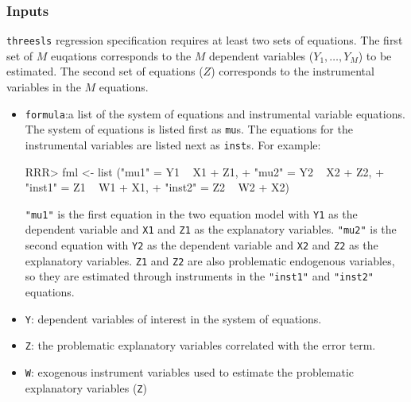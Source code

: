 \subsubsection{Inputs}
\texttt{threesls} regression specification requires at least two sets of equations. The first set of $M$ euqations
corresponds to the $M$ dependent variables ($Y_1,\ldots,Y_M$) to be estimated. The second set of equations ($Z$)
corresponds to the instrumental variables in the $M$ equations.
\begin{itemize}
\item \texttt{formula}:a list of the system of equations and instrumental variable 
equations. The system of equations is listed first as \texttt{mu}s. The equations
for the instrumental variables are listed next as \texttt{inst}s.
For example:
\begin{Schunk}
\begin{Sinput}
RRR>  fml <- list ("mu1"  = Y1 ~ X1 + Z1,
+                "mu2"  = Y2 ~ X2 + Z2,
+                "inst1" = Z1 ~ W1 + X1,
+                "inst2" = Z2 ~ W2 + X2)
\end{Sinput}
\end{Schunk}
\texttt{"mu1"} is the first equation in the two equation model with \texttt{Y1}
as the dependent variable and \texttt{X1} and \texttt{Z1} as
the explanatory variables. \texttt{"mu2"} is the second equation with 
\texttt{Y2} as the dependent variable
and \texttt{X2} and \texttt{Z2} as the explanatory variables. 
\texttt{Z1} and \texttt{Z2} are also problematic endogenous variables, so
they are estimated through instruments in the \texttt{"inst1"} 
and \texttt{"inst2"} equations.
\item \texttt{Y}: dependent variables of interest in the system of equations.
\item \texttt{Z}: the problematic explanatory variables correlated with 
the error term.
\item \texttt{W}: exogenous instrument variables used to estimate the 
problematic explanatory variables (\texttt{Z})
\end{itemize}
